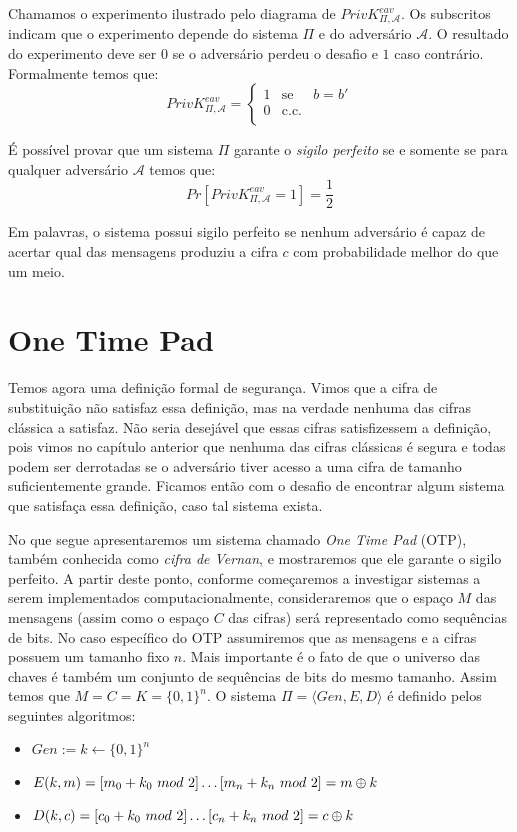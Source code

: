 Chamamos o experimento ilustrado pelo diagrama de $PrivK^{eav}_{\Pi, \mathcal{A}}$.
Os subscritos indicam que o experimento depende do sistema $\Pi$ e do adversário $\mathcal{A}$.
O resultado do experimento deve ser $0$ se o adversário perdeu o desafio e $1$ caso contrário.
Formalmente temos que:
\begin{displaymath}
  PrivK^{eav}_{\Pi, \mathcal{A}} = \left\{
    \begin{array}{lcl}
      1 & \textrm{se} & b = b'\\
      0 & \textrm{c.c.} &\\
    \end{array}
    \right.
\end{displaymath}

É possível provar que um sistema $\Pi$ garante o {\em sigilo perfeito} se e somente se para qualquer adversário $\mathcal{A}$ temos que:
\begin{displaymath}
Pr[PrivK^{eav}_{\Pi, \mathcal{A}} = 1] = \frac{1}{2}
\end{displaymath}

Em palavras, o sistema possui sigilo perfeito se nenhum adversário é capaz de acertar qual das mensagens produziu a cifra $c$ com probabilidade melhor do que um meio.

\section{One Time Pad}
\label{sec:otp}

Temos agora uma definição formal de segurança.
Vimos que a cifra de substituição não satisfaz essa definição, mas na verdade nenhuma das cifras clássica a satisfaz.
Não seria desejável que essas cifras satisfizessem a definição, pois vimos no capítulo anterior que nenhuma das cifras clássicas é segura e todas podem ser derrotadas se o adversário tiver acesso a uma cifra de tamanho suficientemente grande.
Ficamos então com o desafio de encontrar algum sistema que satisfaça essa definição, caso tal sistema exista.

No que segue apresentaremos um sistema chamado {\em One Time Pad} (OTP), também conhecida como {\em cifra de Vernan}, e mostraremos que ele garante o sigilo perfeito.
A partir deste ponto, conforme começaremos a investigar sistemas a serem implementados computacionalmente, consideraremos que o espaço $M$ das mensagens (assim como o espaço $C$ das cifras) será representado como sequências de bits.
No caso específico do OTP assumiremos que as mensagens e a cifras possuem um tamanho fixo $n$.
Mais importante é o fato de que o universo das chaves é também um conjunto de sequências de bits do mesmo tamanho.
Assim temos que $M = C = K = \{0,1\}^n$.
O sistema $\Pi = \langle Gen, E, D \rangle$ é definido pelos seguintes algoritmos:
\begin{itemize}
\item $Gen := k \leftarrow \{0,1\}^n$
\item $E(k,m) = [m_0 + k_0\ mod\ 2] \dots [m_n + k_n\ mod\ 2] = m \oplus k$
\item $D(k,c) = [c_0 + k_0\ mod\ 2] \dots [c_n + k_n\ mod\ 2] = c \oplus k$
\end{itemize}

